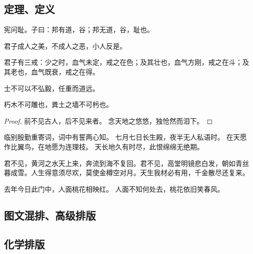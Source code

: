 \documentclass[%
               amsthm,
              ]{xjtubsc}
\begin{document}
\subsection{定理、定义}
\begin{theorem}
宪问耻。子曰：邦有道，谷；邦无道，谷，耻也。
\end{theorem}

\begin{axiom} [论语]
君子成人之美，不成人之恶，小人反是。
\end{axiom}

\begin{definition}
君子有三戒：少之时，血气未定，戒之在色；及其壮也，血气方刚，戒之在斗；及其老也，血气既衰，戒之在得。
\end{definition}

\begin{proposition}
士不可以不弘毅，任重而道远。
\end{proposition}

\begin{lemma}
朽木不可雕也，粪土之墙不可杇也。
\end{lemma}

\begin{proof}
前不见古人，后不见来者。
念天地之悠悠，独怆然而泪下。
\end{proof}


\begin{assumption}
临别殷勤重寄词，词中有誓两心知。 七月七日长生殿，夜半无人私语时。 在天愿作比翼鸟，在地愿为连理枝。 天长地久有时尽，此恨绵绵无绝期。
\end{assumption}

\begin{problem}
君不见，黄河之水天上来，奔流到海不复回。君不见，高堂明镜悲白发，朝如青丝暮成雪。人生得意须尽欢，莫使金樽空对月。天生我材必有用，千金散尽还复来。
\end{problem}

\begin{conjecture}[题都城南庄]
去年今日此门中，人面桃花相映红。 人面不知何处去，桃花依旧笑春风。
\end{conjecture}

\subsection{图文混排、高级排版}

\subsection{化学排版}
\end{document}
